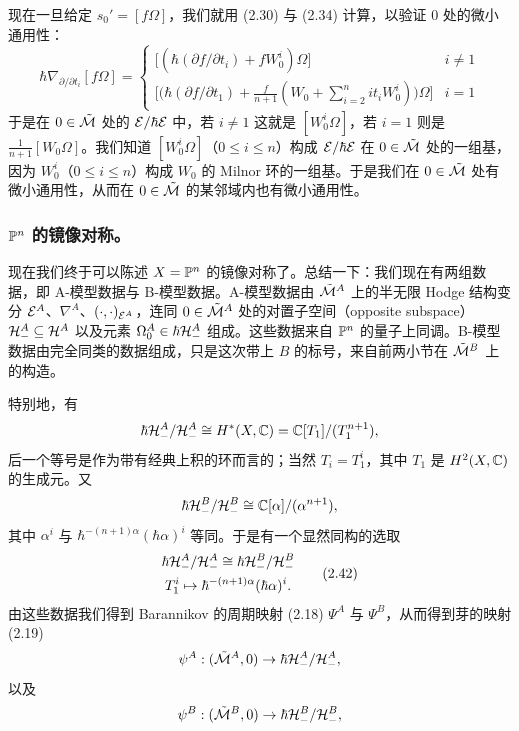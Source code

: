 现在一旦给定 $s_0'=[f\Omega]$，我们就用 (2.30) 与 (2.34) 计算，以验证 $0$ 处的微小通用性：
\[
  \hbar\nabla_{\partial/\partial t_i}[f\Omega]
  =\begin{cases}
    \bigl[(\hbar(\partial f/\partial t_i)+fW_0^{i})\Omega\bigr] & i\ne1\\
    \bigl[\bigl(\hbar(\partial f/\partial t_1)+\frac{f}{n+1}(W_0+\sum_{i=2}^{n}it_iW_0^{i})\bigr)\Omega\bigr] & i=1
  \end{cases}
\]
于是在 $0\in\tilde{\mathcal{M}}$ 处的 $\mathcal{E}/\hbar\mathcal{E}$ 中，若 $i\ne1$ 这就是 $[W_0^{i}\Omega]$，若 $i=1$ 则是 $\frac{1}{n+1}[W_0\Omega]$。我们知道 $[W_0^{i}\Omega]$（$0\le i\le n$）构成 $\mathcal{E}/\hbar\mathcal{E}$ 在 $0\in\tilde{\mathcal{M}}$ 处的一组基，因为 $W_0^{i}$（$0\le i\le n$）构成 $W_0$ 的 Milnor 环的一组基。于是我们在 $0\in\tilde{\mathcal{M}}$ 处有微小通用性，从而在 $0\in\tilde{\mathcal{M}}$ 的某邻域内也有微小通用性。

\subsubsection{$\mathbb{P}^{n}$ 的镜像对称。}现在我们终于可以陈述 $X=\mathbb{P}^{n}$ 的镜像对称了。总结一下：我们现在有两组数据，即 A-模型数据与 B-模型数据。A-模型数据由 $\tilde{\mathcal{M}}^{A}$ 上的半无限 Hodge 结构变分 $\mathcal{E}^{A}$、$\nabla^{A}$、$(\cdot,\cdot)_{\mathcal{E}^{A}}$，连同 $0\in\tilde{\mathcal{M}}^{A}$ 处的对置子空间（opposite subspace）$\mathcal{H}^{A}_-\subseteq\mathcal{H}^{A}$ 以及元素 $\Omega^{A}_0\in\hbar\mathcal{H}^{A}_-$ 组成。这些数据来自 $\mathbb{P}^{n}$ 的量子上同调。B-模型数据由完全同类的数据组成，只是这次带上 $B$ 的标号，来自前两小节在 $\tilde{\mathcal{M}}^{B}$ 上的构造。

特别地，有
\[
  \hbar\mathcal{H}^{A}_-/\mathcal{H}^{A}_-\cong H^{*}(X,\mathbb{C})
  =\mathbb{C}[T_1]/(T_1^{n+1}),
\]
后一个等号是作为带有经典上积的环而言的；当然 $T_i=T_1^{i}$，其中 $T_1$ 是 $H^{2}(X,\mathbb{C})$ 的生成元。又
\[
  \hbar\mathcal{H}^{B}_-/\mathcal{H}^{B}_-\cong\mathbb{C}[\alpha]/(\alpha^{n+1}),
\]
其中 $\alpha^{i}$ 与 $\hbar^{-(n+1)\alpha}(\hbar\alpha)^{i}$ 等同。于是有一个显然同构的选取
\begin{equation}
  \begin{gathered}
    \hbar\mathcal{H}^{A}_-/\mathcal{H}^{A}_-\cong\hbar\mathcal{H}^{B}_-/\mathcal{H}^{B}_-\\
    T_1^{i}\mapsto\hbar^{-(n+1)\alpha}(\hbar\alpha)^{i}.
  \end{gathered} \tag{2.42}
\end{equation}
由这些数据我们得到 Barannikov 的周期映射 (2.18) $\Psi^{A}$ 与 $\Psi^{B}$，从而得到芽的映射 (2.19)
\[
  \psi^{A}:(\tilde{\mathcal{M}}^{A},0)\to\hbar\mathcal{H}^{A}_-/\mathcal{H}^{A}_-,
\]
以及
\[
  \psi^{B}:(\tilde{\mathcal{M}}^{B},0)\to\hbar\mathcal{H}^{B}_-/\mathcal{H}^{B}_-,
\]

